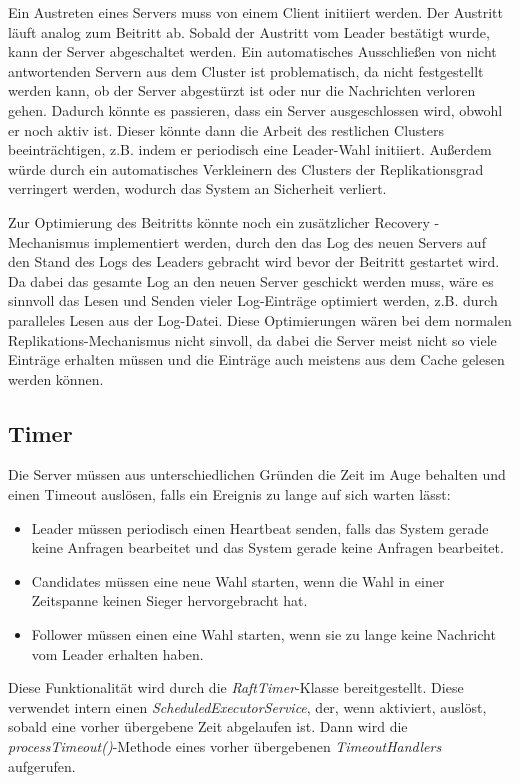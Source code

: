 Ein Austreten eines Servers muss von einem Client initiiert werden. Der Austritt läuft analog zum Beitritt ab. Sobald der Austritt vom Leader bestätigt wurde, kann der Server abgeschaltet werden. Ein automatisches Ausschließen von nicht antwortenden Servern aus dem Cluster ist problematisch, da nicht festgestellt werden kann, ob der Server abgestürzt ist oder nur die Nachrichten verloren gehen. Dadurch könnte es passieren, dass ein Server ausgeschlossen wird, obwohl er noch aktiv ist. Dieser könnte dann die Arbeit des restlichen Clusters beeinträchtigen, z.B. indem er periodisch eine Leader-Wahl initiiert. Außerdem würde durch ein automatisches Verkleinern des Clusters der Replikationsgrad verringert werden, wodurch das System an Sicherheit verliert.

Zur Optimierung des Beitritts könnte noch ein zusätzlicher \glqq Recovery \grqq-Mechanismus implementiert werden, durch den das Log des neuen Servers auf den Stand des Logs des Leaders gebracht wird bevor der Beitritt gestartet wird. Da dabei das gesamte Log an den neuen Server geschickt werden muss, wäre es sinnvoll das Lesen und Senden vieler Log-Einträge optimiert werden, z.B. durch paralleles Lesen aus der Log-Datei. Diese Optimierungen wären bei dem normalen Replikations-Mechanismus nicht sinvoll, da dabei die Server meist nicht so viele Einträge erhalten müssen und die Einträge auch meistens aus dem Cache gelesen werden können.

\subsection{Timer}

Die Server müssen aus unterschiedlichen Gründen die Zeit im Auge behalten und einen Timeout auslösen, falls ein Ereignis zu lange auf sich warten lässt:

\begin{itemize}
	\item Leader müssen periodisch einen Heartbeat senden, falls das System gerade keine Anfragen bearbeitet und das System gerade keine Anfragen bearbeitet.
	\item Candidates müssen eine neue Wahl starten, wenn die Wahl in einer Zeitspanne keinen Sieger hervorgebracht hat.
	\item Follower müssen einen eine Wahl starten, wenn sie zu lange keine Nachricht vom Leader erhalten haben.
\end{itemize}

Diese Funktionalität wird durch die \textit{RaftTimer}-Klasse bereitgestellt. Diese verwendet intern einen \textit{ScheduledExecutorService}, der, wenn aktiviert, auslöst, sobald eine vorher übergebene Zeit abgelaufen ist. Dann wird die \textit{processTimeout()}-Methode eines vorher übergebenen \textit{TimeoutHandlers} aufgerufen. 

